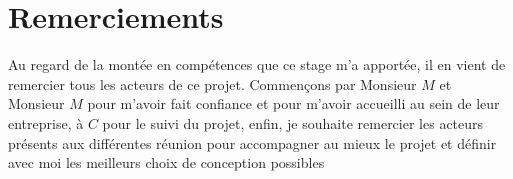 
\section{Remerciements}

Au regard de la montée en compétences que ce stage m'a apportée, il en vient de remercier tous les acteurs de ce projet.\linebreak
Commençons par Monsieur \textit{$M$} et Monsieur \textit{$M$} pour m'avoir fait confiance et pour m'avoir accueilli au sein de leur entreprise, à \textit{$C$} pour le suivi du projet, enfin, je souhaite remercier les acteurs présents aux différentes réunion pour accompagner au mieux le projet et définir avec moi les meilleurs choix de conception possibles\linebreak
\linebreak


\pagebreak
